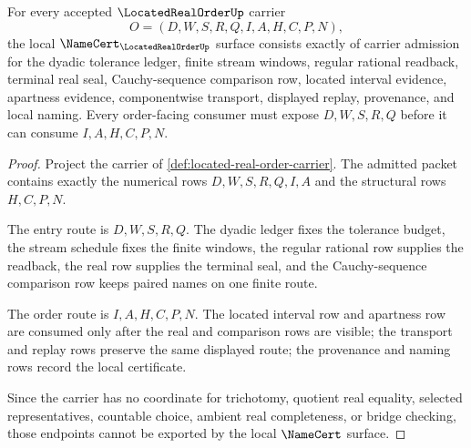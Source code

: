 \begin{theorem}
\label{thm:located-real-order-namecert-obligations}
For every accepted $\LocatedRealOrderUp$ carrier
$$
O=(D,W,S,R,Q,I,A,H,C,P,N),
$$
the local $\NameCert_{\LocatedRealOrderUp}$ surface consists exactly of carrier admission for the dyadic tolerance ledger, finite stream windows, regular rational readback, terminal real seal, Cauchy-sequence comparison row, located interval evidence, apartness evidence, componentwise transport, displayed replay, provenance, and local naming. Every order-facing consumer must expose $D,W,S,R,Q$ before it can consume $I,A,H,C,P,N$.
\end{theorem}
\begin{proof}
Project the carrier of \autoref{def:located-real-order-carrier}. The admitted packet contains exactly the numerical rows $D,W,S,R,Q,I,A$ and the structural rows $H,C,P,N$.

The entry route is $D,W,S,R,Q$. The dyadic ledger fixes the tolerance budget, the stream schedule fixes the finite windows, the regular rational row supplies the readback, the real row supplies the terminal seal, and the Cauchy-sequence comparison row keeps paired names on one finite route.

The order route is $I,A,H,C,P,N$. The located interval row and apartness row are consumed only after the real and comparison rows are visible; the transport and replay rows preserve the same displayed route; the provenance and naming rows record the local certificate.

Since the carrier has no coordinate for trichotomy, quotient real equality, selected representatives, countable choice, ambient real completeness, or bridge checking, those endpoints cannot be exported by the local $\NameCert$ surface.
\end{proof}


